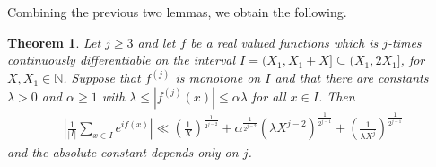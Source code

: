 \documentclass[12pt]{article}
\theoremstyle{plain} %
\newtheorem{theorem}{Theorem}[section]
\theoremstyle{definition} %
\theoremstyle{plain}
\theoremstyle{plain}
\numberwithin{equation}{section}
\newcommand{\N}{\mathbb{N}}
\renewcommand{\leq}{\leqslant}
\renewcommand{\geq}{\geqslant}
\newcommand{\1}{\mathbbm{1}}
\begin{document}
Combining the previous two lemmas, we obtain the following.

\begin{theorem}\label{thm:better_vdc}
    Let $j\geq 3$ and let $f$ be a real valued functions which is $j$-times continuously differentiable on the interval $I = (X_1,X_1+X]\subseteq (X_1,2X_1]$, for $X,X_1\in \N$. Suppose that $f^{(j)}$ is monotone on $I$ and that there are constants $\lambda>0$ and $\alpha\geq 1$ with $\lambda \leq |f^{(j)}(x)|\leq \alpha\lambda $ for all $x\in I$. Then 
    \begin{align}\label{eq:better_vdc}
        \left|\frac{1}{|I|}\sum_{x\in I}e^{if(x)}\right|\ll \left(\frac{1}{X}\right)^{\frac{1}{2^{j-2}}}+\alpha^{\frac{1}{2^{j-2}}} (\lambda X^{j-2})^{\frac{1}{2^{j-1}}}+\left(\frac{1}{\lambda X^{j}}\right)^{\frac{1}{2^{j-1}}}
    \end{align}
    and the absolute constant depends only on $j$.
\end{theorem}
\end{document}
